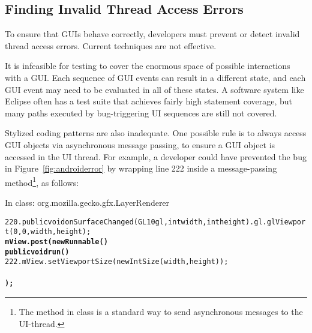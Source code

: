 


\subsection{Finding Invalid Thread Access Errors}
\label{sec:finding}

To ensure that GUIs behave correctly, developers must prevent or detect invalid thread
access errors. Current techniques are not effective. %

It is infeasible for testing to cover the enormous space of possible interactions
with a GUI. Each sequence of GUI events can result in
a different state, and each GUI event may need to be evaluated in all of
these states. A  software system like Eclipse
often has a test suite that achieves fairly high statement coverage,
but many paths executed by bug-triggering UI sequences are still not covered.

Stylized coding patterns are also inadequate. One possible rule is to always
access GUI objects via asynchronous message passing, to ensure a GUI object is accessed in
the UI thread. For example, a developer could have prevented the bug in Figure~\ref{fig:androiderror}
by wrapping line 222 inside a  message-passing method\footnote{The
 method in class  is
a standard way to send asynchronous messages to the UI-thread.}, as follows:

{\vspace{2mm}
\hspace{3mm}\small{In class: org.mozilla.gecko.gfx.LayerRenderer}
\vspace{-2mm}
\begin{CodeOut}
\begin{alltt}
220. public void onSurfaceChanged(GL10 gl, int width, int height) .     gl.glViewport(0, 0, width, height);
         \textbf{mView.post(new Runnable() \ttlcb}
             \textbf{public void run() \ttlcb}
222.             mView.setViewportSize(new IntSize(width, height));
             \textbf{\ttrcb}
         \textbf{\ttrcb);}
     \ttrcb
\end{alltt}
\end{CodeOut}}

